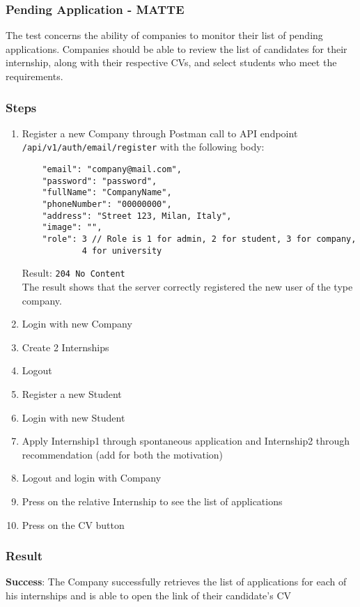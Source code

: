 \subsubsection{Pending Application - MATTE}
The test concerns the ability of companies to monitor their list of pending applications. Companies should be able to review the list of candidates for their internship, along with their respective CVs, and select students who meet the requirements.
\subsubsection*{Steps}
\begin{enumerate}
    \item  Register a new Company through Postman call to API endpoint \verb|/api/v1/auth/email/register| with the following body:
    \begin{verbatim}
    "email": "company@mail.com",
    "password": "password",
    "fullName": "CompanyName",
    "phoneNumber": "00000000",
    "address": "Street 123, Milan, Italy",
    "image": "",
    "role": 3 // Role is 1 for admin, 2 for student, 3 for company,
            4 for university
    \end{verbatim}
    Result: \verb |204 No Content|\\
    The result shows that the server correctly registered the new user of the type company.
    \item Login with new Company
    \item Create 2 Internships
    \item Logout
    \item Register a new Student
    \item Login with new Student
    \item Apply Internship1 through spontaneous application and Internship2 through recommendation (add for both the motivation)
    \item Logout and login with Company 
    \item Press on the relative Internship to see the list of applications
    \item Press on the CV button
\end{enumerate}
\subsubsection*{Result}
\textbf{Success}: The Company successfully retrieves the list of applications for each of his internships and is able to open the link of their candidate's CV
